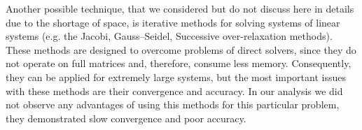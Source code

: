 Another possible technique, that we considered but do not discuss here in details due to the shortage of space, is iterative methods for solving systems of linear systems (e.g. the Jacobi, Gauss–Seidel, Successive over-relaxation methods). These methods are designed to overcome problems of direct solvers, since they do not operate on full matrices and, therefore, consume less memory. Consequently, they can be applied for extremely large systems, but the most important issues with these methods are their convergence and accuracy. In our analysis we did not observe any advantages of using this methods for this particular problem, they demonstrated slow convergence and poor accuracy.

